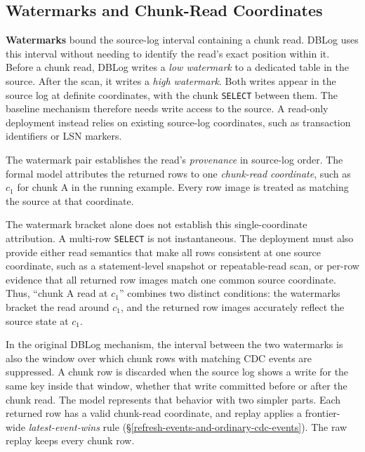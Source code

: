 \documentclass[letterpaper,10pt,twocolumn]{article}
\begin{document}
\subsection{Watermarks and Chunk-Read
Coordinates}\label{watermarks-and-chunk-read-coordinates}

\textbf{Watermarks} bound the source-log interval containing a chunk read.
DBLog uses this interval without needing to identify the read's exact
position within it. Before a chunk
read, DBLog writes a \emph{low watermark} to a dedicated table in the
source. After the scan, it writes a \emph{high watermark}. Both writes
appear in the source log at definite coordinates, with the chunk
\texttt{SELECT} between them. The baseline mechanism therefore needs
write access to the source. A read-only deployment instead relies on
existing source-log coordinates, such as transaction identifiers or LSN markers.

The watermark pair establishes the read's \emph{provenance} in
source-log order. The formal model attributes the returned rows to one
\emph{chunk-read coordinate}, such as $c_1$ for chunk A in the running
example. Every row image is treated as matching the source at that
coordinate.

The watermark bracket alone does not establish this single-coordinate
attribution. A multi-row \texttt{SELECT} is not instantaneous. The
deployment must also provide either read semantics that make all rows
consistent at one source coordinate, such as a statement-level snapshot
or repeatable-read scan, or per-row evidence that all returned row images
match one common source coordinate. Thus, ``chunk A
read at $c_1$'' combines two distinct conditions: the watermarks
bracket the read around $c_1$, and the returned row images accurately
reflect the source state at $c_1$.

In the original DBLog mechanism, the interval between the two
watermarks is also the window over which chunk rows with matching CDC
events are suppressed. A chunk row is discarded when the source log shows a write
for the same key inside that window, whether that write committed
before or after the chunk read. The model represents that behavior with
two simpler parts. Each returned row has a valid chunk-read coordinate,
and replay applies a frontier-wide \emph{latest-event-wins} rule
(\S\ref{refresh-events-and-ordinary-cdc-events}). The raw replay keeps
every chunk row.
\end{document}
